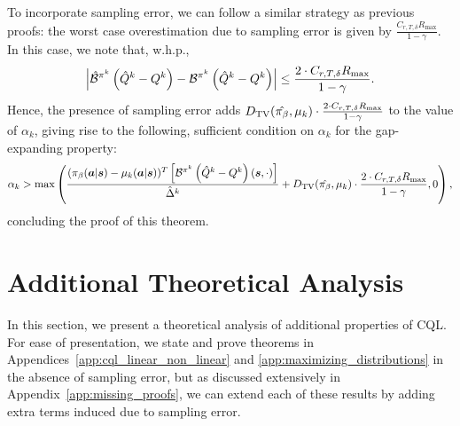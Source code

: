 To incorporate sampling error, we can follow a similar strategy as previous proofs: the worst case overestimation due to sampling error is given by $\frac{C_{r, T, \delta} R_{\max}}{1 - \gamma}$. In this case, we note that, w.h.p.,
\begin{equation*}
    \left\vert \hat{\mathcal{B}}^{\pi^k} \left( \hat{Q}^k - Q^k \right) - \mathcal{B}^{\pi^k} \left( \hat{Q}^k - Q^k \right) \right\vert \leq \frac{2 \cdot C_{r, T, \delta} R_{\max}}{1 - \gamma}. 
\end{equation*}
Hence, the presence of sampling error adds $D_{\mathrm{TV}}(\hat{{\pi_\beta}}, \mu_k) \cdot \frac{2 \cdot C_{r, T, \delta} R_{\max}}{1 - \gamma}$ to the value of $\alpha_k$, giving rise to the following, sufficient condition on $\alpha_k$ for the gap-expanding property:
\begin{equation*}
     \alpha_k > \max \left(\frac{({\pi_\beta}(\boldsymbol{a}|\boldsymbol{s}) - \mu_k(\boldsymbol{a}|\boldsymbol{s}))^T \left[ \mathcal{B}^{\pi^k} \left( \hat{Q}^k - Q^k \right)(\boldsymbol{s}, \cdot) \right]}{\hat{\Delta}^k} + D_{\mathrm{TV}}(\hat{{\pi_\beta}}, \mu_k) \cdot \frac{2 \cdot C_{r, T, \delta} R_{\max}}{1 - \gamma}, 0\right),
\end{equation*}
concluding the proof of this theorem.

\section{Additional Theoretical Analysis}
\label{app:additional_theory}

In this section, we present a theoretical analysis of additional properties of CQL. For ease of presentation, we state and prove theorems in Appendices~\ref{app:cql_linear_non_linear} and \ref{app:maximizing_distributions} in the absence of sampling error, but as discussed extensively in Appendix~\ref{app:missing_proofs}, we can extend each of these results by adding extra terms induced due to sampling error. 


